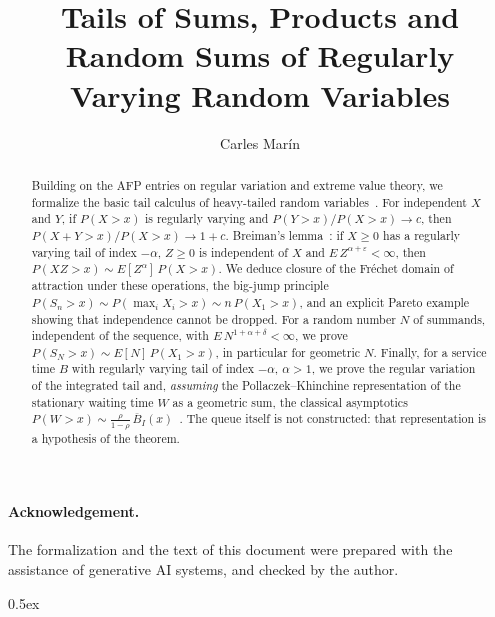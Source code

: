 \documentclass[10pt,a4paper]{article}
\begin{document}
\title{Tails of Sums, Products and Random Sums of Regularly Varying Random Variables}
\author{Carles Mar\'in}
\maketitle

\begin{abstract}
Building on the AFP entries on regular variation and extreme value theory, we formalize the basic tail calculus of
heavy-tailed random variables~\cite{BinghamGoldieTeugels1987,EmbrechtsKluppelbergMikosch1997}. For independent $X$ and $Y$, if
$P(X>x)$ is regularly varying and $P(Y>x)/P(X>x)\to c$, then $P(X+Y>x)/P(X>x)\to 1+c$. Breiman's lemma~\cite{Breiman1965}: if $X\ge 0$ has a regularly varying
tail of index $-\alpha$, $Z\ge 0$ is independent of $X$ and $E\,Z^{\alpha+\varepsilon}<\infty$, then
$P(XZ>x)\sim E[Z^\alpha]\,P(X>x)$. We deduce closure of the Fr\'echet domain of attraction under these operations, the
big-jump principle $P(S_n>x)\sim P(\max_i X_i>x)\sim n\,P(X_1>x)$, and an explicit Pareto example showing that independence
cannot be dropped. For a random number $N$ of summands, independent of the sequence, with
$E\,N^{1+\alpha+\delta}<\infty$, we prove $P(S_N>x)\sim E[N]\,P(X_1>x)$, in particular for geometric $N$. Finally, for a
service time $B$ with regularly varying tail of index $-\alpha$, $\alpha>1$, we prove the regular variation of the integrated tail
and, \emph{assuming} the Pollaczek--Khinchine representation of the stationary waiting time $W$ as a geometric sum, the
classical asymptotics $P(W>x)\sim \frac{\rho}{1-\rho}\,\overline{B}_I(x)$~\cite{Pakes1975}. The queue itself is not constructed:
that representation is a hypothesis of the theorem.
\end{abstract}

\paragraph{Acknowledgement.} The formalization and the text of this document were prepared with the
assistance of generative AI systems, and checked by the author.

\tableofcontents

\parindent 0pt\parskip 0.5ex





\end{document}

